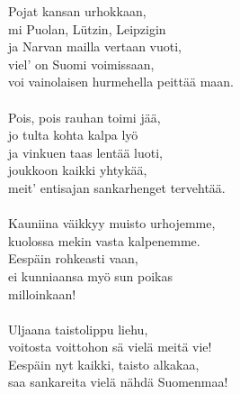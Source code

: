 
            Pojat kansan urhokkaan, \\
            mi Puolan, Lützin, Leipzigin \\
            ja Narvan mailla vertaan vuoti, \\
            viel’ on Suomi voimissaan, \\
            voi vainolaisen hurmehella peittää maan. \\
\hspace{10mm} \\
            Pois, pois rauhan toimi jää, \\
            jo tulta kohta kalpa lyö \\
            ja vinkuen taas lentää luoti, \\
            joukkoon kaikki yhtykää, \\
            meit’ entisajan sankarhenget tervehtää. \\
\hspace{10mm} \\
            Kauniina väikkyy muisto urhojemme, \\
            kuolossa mekin vasta kalpenemme. \\
            Eespäin rohkeasti vaan, \\
            ei kunniaansa myö sun poikas \\
            milloinkaan! \\
\hspace{10mm} \\
            Uljaana taistolippu liehu, \\
            voitosta voittohon sä vielä meitä vie! \\
            Eespäin nyt kaikki, taisto alkakaa, \\
            saa sankareita vielä nähdä Suomenmaa! \\
